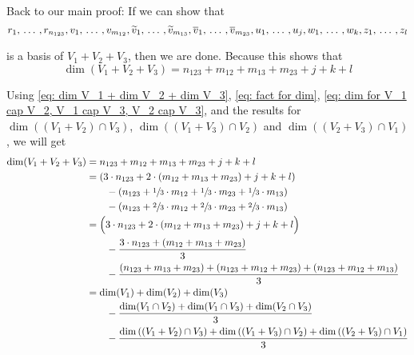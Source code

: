 \begin{xrcs}
  Back to our main proof: If we can show that
  \begin{equation}
    \label{eq: basis of V_1 + V_2 + V_3}
    r_1, {\, \ldots \,\,}, r_{n_{123}}, v_1, {\, \ldots \,\,}, v_{m_{12}}, \widetilde{v}_1, {\, \ldots \,\,}, \widetilde{v}_{m_{13}}, \overline{v}_1, {\, \ldots \,\,}, \overline{v}_{m_{23}}, u_1, {\, \ldots \,\,}, u_j, w_1, {\, \ldots \,\,}, w_k, z_1, {\, \ldots \,\,}, z_l
  \end{equation}

  is a basis of $V_1 + V_2 + V_3$, then we are done. Because this shows that
  \begin{equation}
    \dim (V_1 + V_2 + V_3) = n_{123} + m_{12} + m_{13} + m_{23} + j + k + l
  \end{equation}

  Using \eqref{eq: dim V_1 + dim V_2 + dim V_3}, \eqref{eq: fact for dim}, \eqref{eq: dim for V_1 cap V_2, V_1 cap V_3, V_2 cap V_3}, and the results for $\dim ((V_1+V_2) \cap V_3)$, $\dim ((V_1+V_3) \cap V_2)$ and $\dim ((V_2+V_3) \cap V_1)$, we will get
  \[
  \begin{aligned}
    \dim (V_1 + V_2 + V_3) & = n_{123} + m_{12} + m_{13} + m_{23} + j + k + l \\
    & = \left(3 \cdot n_{123} + 2 \cdot (m_{12}+m_{13}+m_{23})+j+k+l \right) \\
    & \qquad - \left(n_{123} + \sfrac{1}{3} \cdot m_{12} + \sfrac{1}{3} \cdot m_{23} + \sfrac{1}{3} \cdot m_{13} \right) \\
    & \qquad - \left(n_{123}+\sfrac{2}{3} \cdot m_{12} + \sfrac{2}{3} \cdot m_{23} + \sfrac{2}{3} \cdot m_{13} \right) \\
    & = \Big(3 \cdot n_{123} + 2 \cdot (m_{12}+m_{13}+m_{23})+j+k+l \Big) \\
    & \qquad - \frac{3 \cdot n_{123}+(m_{12}+m_{13}+m_{23}) }{3} \\
    & \qquad - \frac{(n_{123} + m_{13} + m_{23})+(n_{123} + m_{12} + m_{23})+(n_{123} + m_{12} + m_{13})}{3} \\
    & = \dim (V_1) + \dim (V_2) + \dim (V_3) \\
    & \qquad - \frac{\dim (V_1 \cap V_2) + \dim (V_1 \cap V_3) + \dim (V_2 \cap V_3)}{3} \\
    & \qquad - \frac{ \dim \left(  (V_1 + V_2) \cap V_3 \right) + \dim \left( (V_1 + V_3) \cap V_2 \right)+ \dim \left( (V_2 + V_3) \cap V_1 \right) }{3} \\
  \end{aligned}
  \]


\end{xrcs}
